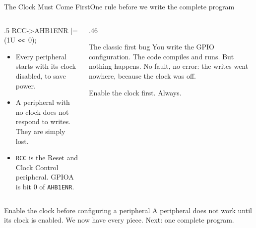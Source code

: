 \documentclass[9pt,aspectratio=169,xcolor=table]{beamer}
\newcommand{\shl}{\texttt{<{}<}}
\begin{document}
\begin{frame}{The Clock Must Come First}{One rule before we write the complete program}
    \begin{columns}[T]
    \begin{column}{.5\textwidth}
        {\ttfamily\normalsize RCC->AHB1ENR |= (1U \shl\ 0);}

        \vspace{3mm}
        \begin{itemize}
            \item Every peripheral starts with its \alert{clock
                  disabled}, to save power.
            \item A peripheral with no clock does not respond to
                  writes. They are simply \alert{lost}.
            \item \texttt{RCC} is the Reset and Clock Control
                  peripheral. GPIOA is bit 0 of \texttt{AHB1ENR}.
        \end{itemize}
    \end{column}
    \begin{column}{.46\textwidth}
        \begin{block}{The classic first bug}
            You write the GPIO configuration. The code compiles and
            runs. But \alert{nothing happens}. No fault, no error: the
            writes went nowhere, because the clock was off.

            \vspace{2mm}
            \alert{Enable the clock first.} Always.
        \end{block}
    \end{column}
    \end{columns}

    \vspace{2mm}
    \begin{block}{Enable the clock before configuring a peripheral}
        A peripheral does not work until its clock is enabled. We now
        have every piece. Next: one complete program.
    \end{block}
\end{frame}
\end{document}
